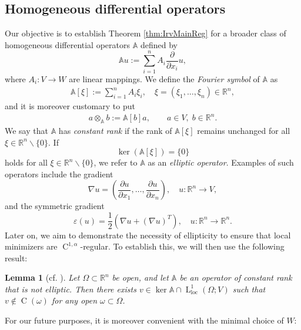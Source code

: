 \documentclass[a4paper,11pt]{amsart}
\numberwithin{equation}{section}
\newcommand{\R}{\mathbb{R}}
\newcommand{\lebe}{\operatorname{L}}
\newcommand{\hold}{\operatorname{C}}
\newtheorem{lemma}[defi]{Lemma}
\begin{document}
	\subsection{Homogeneous differential operators}
	Our objective is to establish Theorem \ref{thm:IrvMainReg} for a broader class of homogeneous differential operators $\mathbb{A}$ defined by
	\begin{equation}
		\mathbb{A}u := \sum_{i=1}^n A_i \frac{\partial}{\partial x_i} u, \label{eq:formA}
	\end{equation}
	where $A_i: V \to W$ are linear mappings. We define the \emph{Fourier symbol} of $\mathbb{A}$ as
	\begin{align}\label{eq:Fouriersymbol1}
		\mathbb{A}[\xi] := \sum_{i=1}^n A_i \xi_i,\quad  \xi = (\xi_1, \ldots, \xi_n) \in \mathbb{R}^n,
	\end{align}
	and it is moreover customary to put 
	\begin{align*}
		a\otimes_{\mathbb{A}}b:=\mathbb{A}[b]a,\qquad a\in V,\;b\in\R^{n}. 
	\end{align*}
	We say that $\mathbb{A}$ has \emph{constant rank} if the rank of $\mathbb{A}[\xi]$ remains unchanged for all $\xi \in \mathbb{R}^n \backslash \{0\}$. If \[
	\ker(\mathbb{A}[\xi]) = \{0\}
	\]
	holds for all $\xi \in \R^n \backslash \{0\}$, we refer to $\mathbb{A}$ as an \emph{elliptic operator}. Examples of such operators include the gradient $$\nabla u = \left( \frac{\partial u}{\partial x_1}, \dots, \frac{\partial u}{\partial x_n} \right), \quad u: \R^n \to V,$$ and the symmetric gradient $$\varepsilon(u) = \frac{1}{2} \left( \nabla u + (\nabla u)^T \right),\quad u:\R^n \to \R^n.$$
	Later on, we aim to demonstrate the necessity of ellipticity to ensure that local minimizers are $\hold^{1,\alpha}$-regular. To establish this, we will then use the following result:
	\begin{lemma}[cf. {\cite[Cor. 4.3]{contiFXG}}] \label{Kernel}
		Let $\Omega \subset \mathbb{R}^n$ be open, and let $\mathbb{A}$ be an operator of constant rank that is not elliptic. Then there exists $v \in \ker{\mathbb{A}} \cap \lebe^1_{\mathrm{loc}}(\Omega;V)$ such that $v \notin \hold(\omega)$ for any open $\omega \subset \Omega$.
	\end{lemma}
	For our future purposes, it is moreover convenient with the minimal choice of $W$:
\end{document}
